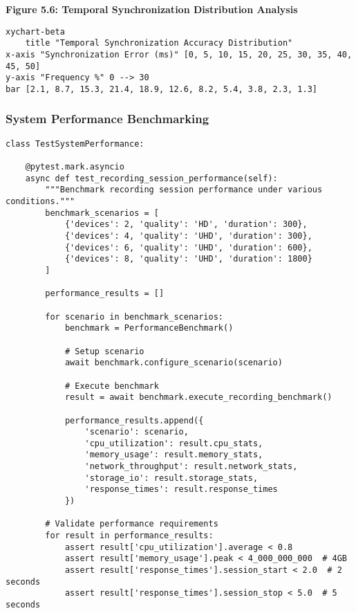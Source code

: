 \documentclass[11pt,a4paper]{report}
\begin{document}
\textbf{Figure 5.6: Temporal Synchronization Distribution Analysis}

\begin{verbatim}
xychart-beta
    title "Temporal Synchronization Accuracy Distribution"
x-axis "Synchronization Error (ms)" [0, 5, 10, 15, 20, 25, 30, 35, 40, 45, 50]
y-axis "Frequency %" 0 --> 30
bar [2.1, 8.7, 15.3, 21.4, 18.9, 12.6, 8.2, 5.4, 3.8, 2.3, 1.3]
\end{verbatim}

\subsubsection{System Performance Benchmarking}

\begin{verbatim}
class TestSystemPerformance:

    @pytest.mark.asyncio
    async def test_recording_session_performance(self):
        """Benchmark recording session performance under various conditions."""
        benchmark_scenarios = [
            {'devices': 2, 'quality': 'HD', 'duration': 300},
            {'devices': 4, 'quality': 'UHD', 'duration': 300},
            {'devices': 6, 'quality': 'UHD', 'duration': 600},
            {'devices': 8, 'quality': 'UHD', 'duration': 1800}
        ]

        performance_results = []

        for scenario in benchmark_scenarios:
            benchmark = PerformanceBenchmark()

            # Setup scenario
            await benchmark.configure_scenario(scenario)

            # Execute benchmark
            result = await benchmark.execute_recording_benchmark()

            performance_results.append({
                'scenario': scenario,
                'cpu_utilization': result.cpu_stats,
                'memory_usage': result.memory_stats,
                'network_throughput': result.network_stats,
                'storage_io': result.storage_stats,
                'response_times': result.response_times
            })

        # Validate performance requirements
        for result in performance_results:
            assert result['cpu_utilization'].average < 0.8
            assert result['memory_usage'].peak < 4_000_000_000  # 4GB
            assert result['response_times'].session_start < 2.0  # 2 seconds
            assert result['response_times'].session_stop < 5.0  # 5 seconds


\end{verbatim}
\end{document}
